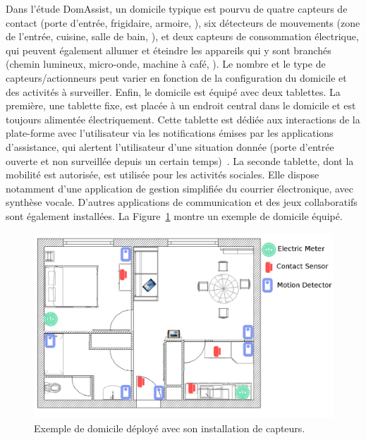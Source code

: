 Dans l'étude DomAssist, un domicile typique est pourvu de quatre
capteurs de contact (porte d'entrée, frigidaire, armoire, \etc), six
détecteurs de mouvements (zone de l'entrée, cuisine, salle de bain,
\etc), et deux capteurs de consommation électrique, qui peuvent
également allumer et éteindre les appareils qui y sont branchés
(chemin lumineux, micro-onde, machine à café, \etc). Le nombre et le
type de capteurs/actionneurs peut varier en fonction de la
configuration du domicile et des activités à surveiller. Enfin, le
domicile est équipé avec deux tablettes. La première, une tablette
fixe, est placée à un endroit central dans le domicile et est toujours
alimentée électriquement. Cette tablette est dédiée aux interactions
de la plate-forme avec l'utilisateur via les notifications émises par
les applications d'assistance, qui alertent l'utilisateur d'une
situation donnée (\eg porte d'entrée ouverte et non surveillée depuis
un certain temps)~.  La seconde tablette,
dont la mobilité est autorisée, est utilisée pour les activités
sociales. Elle dispose notamment d'une application de gestion
simplifiée du courrier électronique, avec synthèse vocale. D'autres
applications de communication et des jeux collaboratifs sont également installées.
La Figure~\ref{fig:mapdeployed} montre un exemple de domicile équipé.

\begin{figure}[]
  \centering
      \includegraphics[width=\linewidth,totalheight=\textheight,keepaspectratio]{gfx/Map.png}
      \caption{Exemple de domicile déployé avec son installation de capteurs.}
      \label{fig:mapdeployed}
\end{figure}


